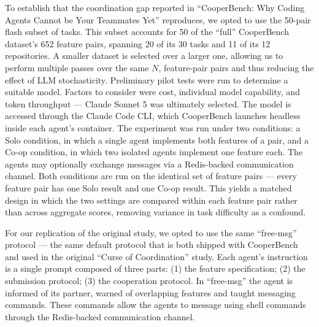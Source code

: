 \documentclass[11pt,a4paper]{article}
\begin{document}
To establish that the coordination gap reported in ``CooperBench: Why Coding Agents Cannot be Your Teammates Yet'' reproduces, we opted to use the 50-pair flash subset of tasks. This subset accounts for 50 of the ``full'' CooperBench dataset's 652 feature pairs, spanning 20 of its 30 tasks and 11 of its 12 repositories. A smaller dataset is selected over a larger one, allowing us to perform multiple passes over the same $N$, feature-pair pairs and thus reducing the effect of LLM stochasticity. Preliminary pilot tests were run to determine a suitable model. Factors to consider were cost, individual model capability, and token throughput --- Claude Sonnet 5 was ultimately selected. The model is accessed through the Claude Code CLI, which CooperBench launches headless inside each agent's container. The experiment was run under two conditions: a Solo condition, in which a single agent implements both features of a pair, and a Co-op condition, in which two isolated agents implement one feature each. The agents may optionally exchange messages via a Redis-backed communication channel. Both conditions are run on the identical set of feature pairs --- every feature pair has one Solo result and one Co-op result. This yields a matched design in which the two settings are compared within each feature pair rather than across aggregate scores, removing variance in task difficulty as a confound.

For our replication of the original study, we opted to use the same ``free-msg'' protocol --- the same default protocol that is both shipped with CooperBench and used in the original ``Curse of Coordination'' study. Each agent's instruction is a single prompt composed of three parts: (1) the feature specification; (2) the submission protocol; (3) the cooperation protocol. In ``free-msg'' the agent is informed of its partner, warned of overlapping features and taught messaging commands. These commands allow the agents to message using shell commands through the Redis-backed communication channel.
\end{document}
